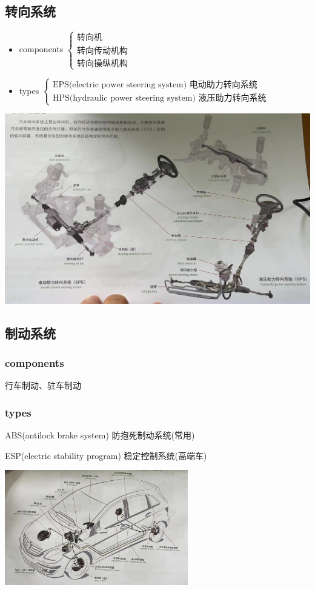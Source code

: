 \subsection{转向系统}
	\begin{itemize}
		\item components
			$ \begin{cases}
				\text{转向机} \\
				\text{转向传动机构} \\
				\text{转向操纵机构}
			\end{cases} $
		\item types
			$ \begin{cases}
				\text{EPS(electric power steering system) 电动助力转向系统} \\
				\text{HPS(hydraulic power steering system) 液压助力转向系统}
			\end{cases} $
	\end{itemize}
	\begin{center}
		\includegraphics[width=.9\textwidth]{3-4}
	\end{center}
\subsection{制动系统}
	\subsubsection{components}
		行车制动、驻车制动
	\subsubsection{types}
		ABS(antilock brake system) 防抱死制动系统(常用)
		
		ESP(electric stability program) 稳定控制系统(高端车)
	\begin{center}
		\includegraphics[width=0.6\textwidth]{3-5}
	\end{center}
